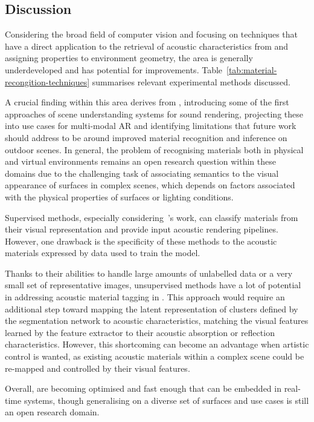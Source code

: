 \subsection{Discussion}
Considering the broad field of computer vision and focusing on techniques that have a direct application to the retrieval of acoustic characteristics from  and assigning properties to environment geometry, the area is generally underdeveloped and has potential for improvements. Table~\ref{tab:material-recongition-techniques} summarises relevant experimental methods discussed.\par
A crucial finding within this area derives from \cite{schissler2017acoustic}, introducing some of the first approaches of scene understanding systems for sound rendering, projecting these into use cases for multi-modal AR and identifying limitations that future work should address to be around improved material recognition and inference on outdoor scenes. In general, the problem of recognising materials both in physical and virtual environments remains an open research question within these domains due to the challenging task of associating semantics to the visual appearance of surfaces in complex scenes, which depends on factors associated with the physical properties of surfaces or lighting conditions.\par 
Supervised methods, especially considering~\cite{kim2019immersive}'s work, can classify materials from their visual representation and provide input acoustic rendering pipelines. However, one drawback is the specificity of these methods to the acoustic materials expressed by data used to train the model.\par
Thanks to their abilities to handle large amounts of unlabelled data or a very small set of representative images, unsupervised methods have a lot of potential in addressing acoustic material tagging in . This approach would require an additional step toward mapping the latent representation of clusters defined by the segmentation network to acoustic characteristics, matching the visual features learned by the feature extractor to their acoustic absorption or reflection characteristics. However, this shortcoming can become an advantage when artistic control is wanted, as existing acoustic materials within a complex scene could be re-mapped and controlled by their visual features.\par
Overall,  are becoming optimised and fast enough that can be embedded in real-time systems, though generalising on a diverse set of surfaces and use cases is still an open research domain.


